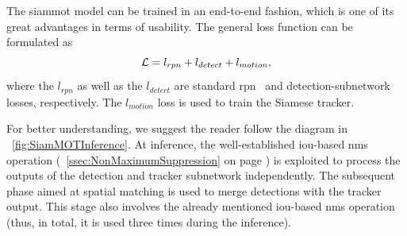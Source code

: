 The \gls{siammot} model can be trained in an end-to-end fashion, which is one of its great advantages in terms of usability. The general loss function can be formulated as
\begin{equation}
    \label{eq:SiamMOTGeneralLoss}
    \mathcal{L} = l_{rpn} + l_{detect} + l_{motion},
\end{equation}
where the $l_{rpn}$ as well as the $l_{detect}$ are standard \gls{rpn}~\cite{ren2017fasterrcnn} and detection-subnetwork~\cite{girshick2015fast} losses, respectively. The $l_{motion}$ loss is used to train the Siamese tracker.

For better understanding, we suggest the reader follow the diagram in \figtext{}~\ref{fig:SiamMOTInference}. At inference, the well-established \gls{iou}-based \gls{nms} operation (\sectiontext{}~\ref{ssec:NonMaximumSuppression} on page \pageref{ssec:NonMaximumSuppression}) is exploited to process the outputs of the detection and tracker subnetwork independently. The subsequent phase aimed at spatial matching is used to merge detections with the tracker output. This stage also involves the already mentioned \gls{iou}-based \gls{nms} operation (thus, in total, it is used three times during the inference).

